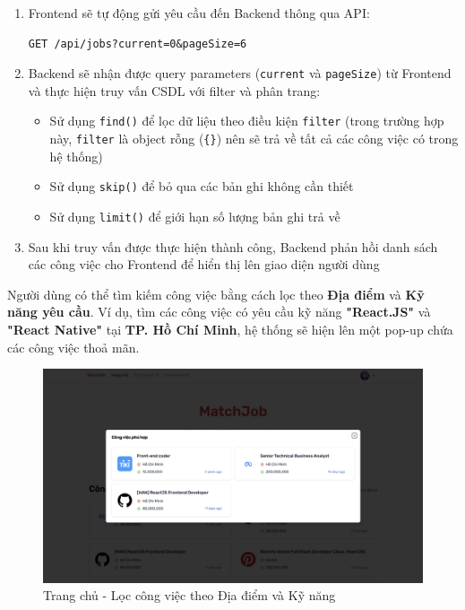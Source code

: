 \begin{enumerate}
    \item Frontend sẽ tự động gửi yêu cầu đến Backend thông qua API:
    \begin{lstlisting}[numbers=none]
GET /api/jobs?current=0&pageSize=6
    \end{lstlisting}
    
    \item Backend sẽ nhận được query parameters (\texttt{current} và \texttt{pageSize}) từ Frontend và thực hiện truy vấn CSDL với filter và phân trang:
    \begin{itemize}
        \item Sử dụng \texttt{find()} để lọc dữ liệu theo điều kiện \texttt{filter} (trong trường hợp này, \texttt{filter} là object rỗng (\texttt{\{\}}) nên sẽ trả về tất cả các công việc có trong hệ thống)
        \item Sử dụng \texttt{skip()} để bỏ qua các bản ghi không cần thiết
        \item Sử dụng \texttt{limit()} để giới hạn số lượng bản ghi trả về
    \end{itemize}

    \item Sau khi truy vấn được thực hiện thành công, Backend phản hồi danh sách các công việc cho Frontend để hiển thị lên giao diện người dùng
\end{enumerate}

Người dùng có thể tìm kiếm công việc bằng cách lọc theo \textbf{Địa điểm} và \textbf{Kỹ năng yêu cầu}. Ví dụ, tìm các công việc có yêu cầu kỹ năng \textbf{"React.JS"} và \textbf{"React Native"} tại \textbf{TP. Hồ Chí Minh}, hệ thống sẽ hiện lên một pop-up chứa các công việc thoả mãn.

\begin{figure}[H]
    \centering
    \includegraphics[width=\linewidth]{DBMS-Application/Images/modal-job-search.png}
    \caption{Trang chủ - Lọc công việc theo Địa điểm và Kỹ năng}
    \label{fig:homepage-job-search-filter}
\end{figure}

